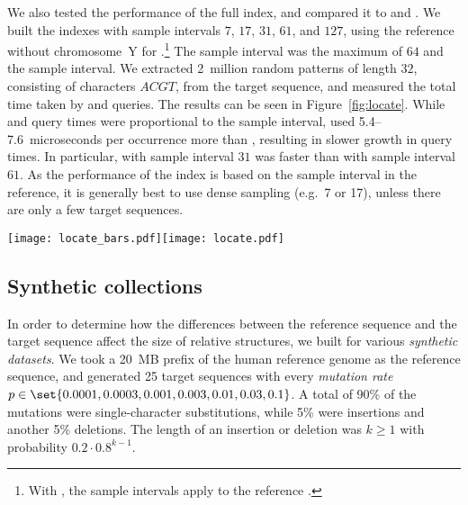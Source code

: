 We also tested the \locate{} performance of the full \RFM{} index, and
compared it to \SSA{} and \SSArrr. We built the indexes with \SA{} sample
intervals $7$, $17$, $31$, $61$, and $127$, using the reference without
chromosome~Y for \RFM.\footnote{With \RFM, the sample intervals apply
to the reference \SSA.} The \ISA{} sample interval was the
maximum of $64$ and the \SA{} sample interval. We extracted 2~million
random patterns of length $32$, consisting of characters $ACGT$, from
the target sequence, and measured the total time taken by \find{} and
\locate{} queries. The results can be seen in
Figure~\ref{fig:locate}. While \SSA{} and \SSArrr{} query times were
proportional to the sample interval, \RFM{} used 5.4\nobreakdash--7.6~microseconds
per occurrence more than \SSA{}, resulting in slower growth in query times.
In particular, \RFM{} with sample interval $31$ was faster than
\SSA{} with sample interval $61$. As the \locate{} performance of the \RFM{}
index is based on the sample interval in the reference, it is generally best
to use dense sampling (e.g.~7 or 17), unless there are only a few target
sequences.

\begin{figure*}
\begin{center}
\texttt{[image: locate\_bars.pdf]}\hspace{-0.6in}\texttt{[image: locate.pdf]}
\end{center}
\caption{Average \find{} and \locate{} times in microseconds per occurrence for 2~million patterns
of length $32$ with a total of 255~million occurrences on NA12878 relative to
the human reference genome without chromosome~Y. Left: Query time vs.\ suffix array
sample interval. Right: Query time vs.\ index size in bits per character.}\label{fig:locate}
\end{figure*}

\subsection{Synthetic collections}

In order to determine how the differences between the reference sequence and
the target sequence affect the size of relative structures, we built \RCST{}
for various \emph{synthetic datasets}. We took a 20~MB prefix of the human
reference genome as the reference sequence, and generated 25 target
sequences with every \emph{mutation rate} $p \in \set{0.0001, 0.0003, 0.001, 0.003,
0.01, 0.03, 0.1}$. A total of 90\% of the mutations were single-character
substitutions, while 5\% were insertions and another 5\% deletions. The length of an
insertion or deletion was $k \ge 1$ with probability $0.2 \cdot 0.8^{k-1}$.

